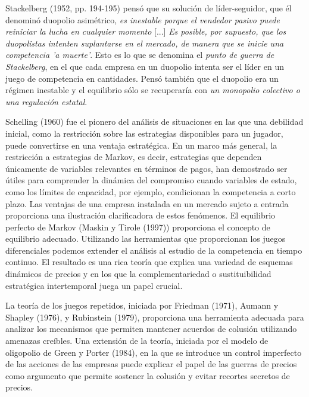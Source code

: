 \documentclass[10pt,a4paper]{article}
\begin{document}
Stackelberg (1952, pp. 194-195) pensó que su solución de líder-seguidor, que él denominó duopolio asimétrico, \textit{es inestable porque el vendedor pasivo puede reiniciar la lucha en cualquier momento }[...]\textit{ Es posible, por supuesto, que los duopolistas intenten suplantarse en el mercado, de manera que se inicie una competencia 'a muerte'}. Esto es lo que se denomina el \textit{punto de guerra de Stackelberg}, en el que cada empresa en un duopolio intenta ser el líder en un juego de competencia en cantidades. Pensó también que el duopolio era un régimen inestable y el equilibrio sólo se recuperaría con \textit{un monopolio colectivo o una regulación estatal}. 

Schelling (1960) fue el pionero del análisis de situaciones en las que una debilidad inicial, como la restricción sobre las estrategias disponibles para un jugador, puede convertirse en una ventaja estratégica. En un marco más general, la restricción a estrategias de Markov, es decir, estrategias que dependen únicamente de variables relevantes en términos de pagos, han demostrado ser útiles para comprender la dinámica del compromiso cuando variables de estado, como los límites de capacidad, por ejemplo, condicionan la competencia a corto plazo. Las ventajas de una empresa instalada en un mercado sujeto a entrada proporciona una ilustración clarificadora de estos fenómenos. El equilibrio perfecto de Markov (Maskin y Tirole (1997)) proporciona el concepto de equilibrio adecuado. Utilizando las herramientas que proporcionan los juegos diferenciales podemos extender el análisis al estudio de la competencia en tiempo continuo. El resultado es una rica teoría que explica una variedad de esquemas dinámicos de precios y en los que la complementariedad o sustituibilidad estratégica intertemporal juega un papel crucial. 

La teoría de los juegos repetidos, iniciada por Friedman (1971), Aumann y Shapley (1976), y Rubinstein (1979), proporciona una herramienta adecuada para analizar los mecanismos que permiten mantener acuerdos de colusión utilizando amenazas creíbles. Una extensión de la teoría, iniciada por el modelo de oligopolio de Green y Porter (1984), en la que se introduce un control imperfecto de las acciones de las empresas puede explicar el papel de las guerras de precios como argumento que permite sostener la colusión y evitar recortes secretos de precios. 
\end{document}

